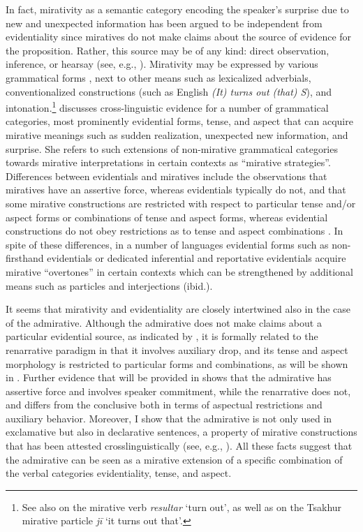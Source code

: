 \documentclass[output=paper,
colorlinks,
citecolor=brown,
newtxmath
]{langscibook}
\begin{document}
In fact, mirativity as a semantic category encoding the speaker's surprise due to new and unexpected information has been argued to be independent from evidentiality since miratives do not make claims about the source of evidence for the proposition. Rather, this source may be of any kind: direct observation, inference, or hearsay (see, e.g., \citealt{Jacobsen1964,Watters2002}). Mirativity may be expressed by various grammatical forms \citep{DeLancey1997,DeLancey2001,DeLancey2012}, next to other means such as lexicalized adverbials, conventionalized constructions (such as English \textit{(It) turns out (that) S}), and intonation.\footnote{See also \citet[160]{Bustamante2013} on the  mirative verb \textit{resultar} `turn out', as well as \citet[290]{TatevosovMaisak1999} on the Tsakhur mirative particle \textit{jī} `it turns out that'.} \citet{Aikhenvald2012} discusses cross-linguistic evidence for a number of grammatical categories, most prominently evidential forms, tense, and aspect that can acquire mirative meanings such as sudden realization, unexpected new information, and surprise. She refers to such extensions of non-mirative grammatical categories towards mirative interpretations in certain contexts as ``mirative strategies''. Differences between evidentials and miratives include the observations that miratives have an assertive force, whereas evidentials typically do not, and that some mirative constructions are restricted with respect to particular tense and/or aspect forms or combinations of tense and aspect forms, whereas evidential constructions do not obey restrictions as to tense and aspect combinations \citep[441]{Aikhenvald2012}.
In spite of these differences, in a number of languages evidential forms such as non-firsthand evidentials or dedicated inferential and reportative evidentials acquire mirative ``overtones'' in certain contexts which can be strengthened by additional means such as particles and interjections (ibid.).

It seems that mirativity and evidentiality are closely intertwined also in the case of the  admirative. Although the  admirative does not make claims about a particular evidential source, as indicated by , it is formally related to the renarrative paradigm in that it involves auxiliary drop, and its tense and aspect morphology is restricted to particular forms and combinations, as will be shown in . Further evidence that will be provided in  shows that the  admirative has assertive force and involves speaker commitment, while the renarrative does not, and differs from the conclusive both in terms of aspectual restrictions and auxiliary behavior. Moreover, I show that the admirative is not only used in exclamative but also in declarative sentences, a property of mirative constructions that has been attested crosslinguistically (see, e.g., \citealt{Bustamante2013}). All these facts suggest that the  admirative can be seen as a mirative extension of a specific combination of the verbal categories evidentiality, tense, and aspect.
\end{document}
